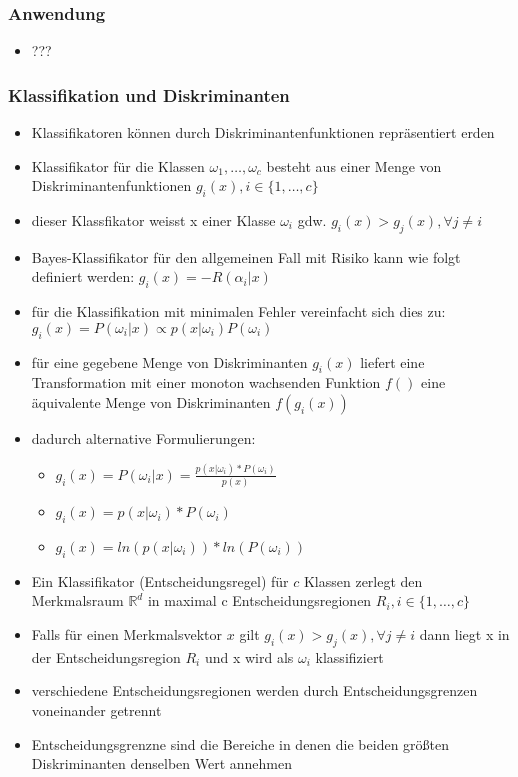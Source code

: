 \documentclass{article} %
\begin{document}
		\subsubsection{Anwendung}
		\begin{itemize}
			\item ???
		\end{itemize}
		\subsubsection{Klassifikation und Diskriminanten}
		\begin{itemize}
			\item Klassifikatoren können durch Diskriminantenfunktionen repräsentiert erden
			\item Klassifikator für die Klassen $\omega_1,\dots,\omega_c$ besteht aus einer Menge von Diskriminantenfunktionen $g_i(x),i\in\{1,\dots,c\}$
			\item dieser Klassfikator weisst x einer Klasse $\omega_i$ gdw. $g_i(x) > g_j(x), \forall j\neq i$
			\item Bayes-Klassifikator für den allgemeinen Fall mit Risiko kann wie folgt definiert werden: $g_i(x) = -R(\alpha_i|x)$
			\item für die Klassifikation mit minimalen Fehler vereinfacht sich dies zu: $g_i(x) = P(\omega_i|x) \propto p(x|\omega_i)P(\omega_i)$
			\item für eine gegebene Menge von Diskriminanten $g_i(x)$ liefert eine Transformation mit einer monoton wachsenden Funktion $f()$ eine äquivalente Menge von Diskriminanten $f(g_i(x))$
			\item dadurch alternative Formulierungen:
			\begin{itemize}
				\item $g_i(x) = P(\omega_i|x) = \frac{p(x|\omega_i)*P(\omega_i)}{p(x)}$
				\item $g_i(x) =p(x|\omega_i)*P(\omega_i)$
				\item $g_i(x) = ln(p(x|\omega_i))*ln(P(\omega_i))$
			\end{itemize}
			\item Ein Klassifikator (Entscheidungsregel) für $c$ Klassen zerlegt den Merkmalsraum $\mathbb{R}^d$ in maximal c Entscheidungsregionen $R_i,i\in \{1,\dots,c\}$
			\item Falls für einen Merkmalsvektor $x$ gilt $g_i(x) > g_j(x),\forall j\neq i$ dann liegt x in der Entscheidungsregion $R_i$ und x wird als $\omega_i$ klassifiziert
			\item verschiedene Entscheidungsregionen werden durch Entscheidungsgrenzen voneinander getrennt
			\item Entscheidungsgrenzne sind die Bereiche in denen die beiden größten Diskriminanten denselben Wert annehmen
		\end{itemize}



\end{document}
